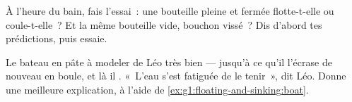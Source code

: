 \begin{exercise}[$\star$]\label{exo:g1:floating-and-sinking:8}
À l'heure du bain, fais l'essai~: une bouteille pleine et fermée
flotte-t-elle ou coule-t-elle~? Et la même bouteille vide, bouchon
vissé~? Dis d'abord tes prédictions, puis essaie.
\end{exercise}

\begin{exercise}[$\star\star$]\label{exo:g1:floating-and-sinking:9}
Le bateau en pâte à modeler de Léo  très bien --- jusqu'à ce
qu'il l'écrase de nouveau en boule, et là il . «~L'eau s'est
fatiguée de le tenir~», dit Léo. Donne une meilleure explication, à
l'aide de \cref{ex:g1:floating-and-sinking:boat}.
\end{exercise}
